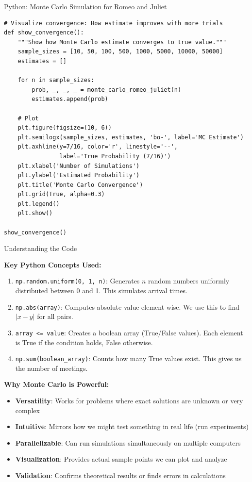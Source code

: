\begin{itemize}
\begin{codeblock}{Python: Monte Carlo Simulation for Romeo and Juliet}
\begin{lstlisting}
# Visualize convergence: How estimate improves with more trials
def show_convergence():
    """Show how Monte Carlo estimate converges to true value."""
    sample_sizes = [10, 50, 100, 500, 1000, 5000, 10000, 50000]
    estimates = []

    for n in sample_sizes:
        prob, _, _, _ = monte_carlo_romeo_juliet(n)
        estimates.append(prob)

    # Plot
    plt.figure(figsize=(10, 6))
    plt.semilogx(sample_sizes, estimates, 'bo-', label='MC Estimate')
    plt.axhline(y=7/16, color='r', linestyle='--',
                label='True Probability (7/16)')
    plt.xlabel('Number of Simulations')
    plt.ylabel('Estimated Probability')
    plt.title('Monte Carlo Convergence')
    plt.grid(True, alpha=0.3)
    plt.legend()
    plt.show()

show_convergence()
\end{lstlisting}
\end{codeblock}

\begin{keyconceptboxbreak}{Understanding the Code}

\textbf{Key Python Concepts Used:}

\begin{enumerate}
    \item \texttt{np.random.uniform(0, 1, n)}: Generates $n$ random numbers uniformly distributed between 0 and 1. This simulates arrival times.

    \item \texttt{np.abs(array)}: Computes absolute value element-wise. We use this to find $|x - y|$ for all pairs.

    \item \texttt{array <= value}: Creates a boolean array (True/False values). Each element is True if the condition holds, False otherwise.

    \item \texttt{np.sum(boolean\_array)}: Counts how many True values exist. This gives us the number of meetings.
\end{enumerate}

\textbf{Why Monte Carlo is Powerful:}

\begin{itemize}
    \item \textbf{Versatility}: Works for problems where exact solutions are unknown or very complex
    \item \textbf{Intuitive}: Mirrors how we might test something in real life (run experiments)
    \item \textbf{Parallelizable}: Can run simulations simultaneously on multiple computers
    \item \textbf{Visualization}: Provides actual sample points we can plot and analyze
    \item \textbf{Validation}: Confirms theoretical results or finds errors in calculations
\end{itemize}


\end{keyconceptboxbreak}
\end{itemize}
